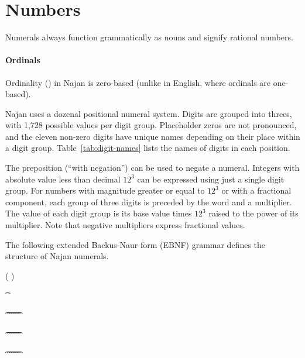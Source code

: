 
\section{Numbers} \label{sec:numbers}

Numerals always function grammatically as nouns and signify rational numbers.

\paragraph{Ordinals} Ordinality () in Najan is zero-based (unlike in
English, where ordinals are one-based).



Najan uses a dozenal positional numeral system. Digits are grouped into threes,
with 1,728 possible values per digit group. Placeholder zeros are not
pronounced, and the eleven non-zero digits have unique names depending on their
place within a digit group. Table~\ref{tab:digit-names} lists the names of
digits in each position.

The preposition  (``with negation'') can be used to negate a
numeral. Integers with absolute value less than decimal $12^3$ can be expressed
using just a single digit group. For numbers with magnitude greater or equal to
$12^3$ or with a fractional component, each group of three digits is preceded by
the word  and a multiplier. The value of each digit group is its
base value times $12^3$ raised to the power of its multiplier. Note that
negative multipliers express fractional values.

The following extended Backus-Naur form (EBNF) grammar defines the structure of
Najan numerals.

\begin{ebnf}
	 \is {} ( \alt {})

	 \is {}  
	\altLine {} 
	\altLine {}
	\altLine \t{}

	 \is \t{} \alt \t{} \alt \t{} \alt \t{} \alt \t{} \alt \t{} \alt \t{}

	 \is \t{} \alt \t{} \alt \t{} \alt \t{} \alt \t{} \alt \t{} \alt \t{}

	 \is \t{} \alt \t{} \alt \t{} \alt \t{} \alt \t{} \alt \t{} \alt \t{}
\end{ebnf}

